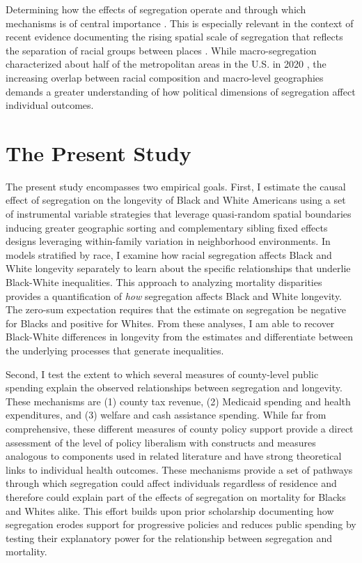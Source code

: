 \documentclass[11pt]{article}
\begin{document}
Determining how the effects of segregation operate and through which mechanisms is of central importance \citep{sharkey_where_2014}. This is especially relevant in the context of recent evidence documenting the rising spatial scale of segregation that reflects the separation of racial groups between places \citep{carlson_changing_2026,lichter_toward_2015}. While macro-segregation characterized about half of the metropolitan areas in the U.S. in 2020 \citep{carlson_changing_2026}, the increasing overlap between racial composition and macro-level geographies demands a greater understanding of how political dimensions of segregation affect individual outcomes.

\section{The Present Study}

The present study encompasses two empirical goals. First, I estimate the causal effect of segregation on the longevity of Black and White Americans using a set of instrumental variable strategies that leverage quasi-random spatial boundaries inducing greater geographic sorting and complementary sibling fixed effects designs leveraging within-family variation in neighborhood environments. In models stratified by race, I examine how racial segregation affects Black and White longevity separately to learn about the specific relationships that underlie Black-White inequalities. This approach to analyzing mortality disparities provides a quantification of \textit{how} segregation affects Black and White longevity. The zero-sum expectation requires that the estimate on segregation be negative for Blacks and positive for Whites. From these analyses, I am able to recover Black-White differences in longevity from the estimates and differentiate between the underlying processes that generate inequalities.

Second, I test the extent to which several measures of county-level public spending explain the observed relationships between segregation and longevity. These mechanisms are (1) county tax revenue, (2) Medicaid spending and health expenditures, and (3) welfare and cash assistance spending. While far from comprehensive, these different measures of county policy support provide a direct assessment of the level of policy liberalism with constructs and measures analogous to components used in related literature \citep{montez_us_2020} and have strong theoretical links to individual health outcomes. These mechanisms provide a set of pathways through which segregation could affect individuals regardless of residence and therefore could explain part of the effects of segregation on mortality for Blacks and Whites alike. This effort builds upon prior scholarship documenting how segregation erodes support for progressive policies and reduces public spending \citep{chyn_effects_2026,trounstine_segregation_2016} by testing their explanatory power for the relationship between segregation and mortality. 
\end{document}
